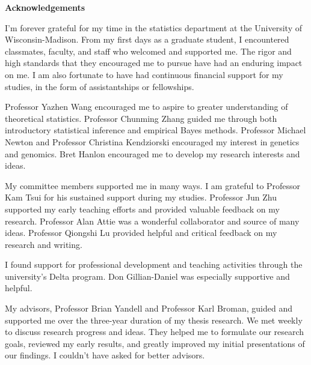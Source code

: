 \newenvironment{acknowledgements}%
    {\cleardoublepage\null\vfill\begin{center}%
    \bfseries Acknowledgements\end{center}}%
    {\vfill\null}
        \begin{acknowledgements}
I'm forever grateful for my time in the statistics department at the University of Wisconsin-Madison. From my first days as a graduate student, I encountered classmates, faculty, and staff who welcomed and supported me. The rigor and high standards that they encouraged me to pursue have had an enduring impact on me. I am also fortunate to have had continuous financial support for my studies, in the form of assistantships or fellowships. 

Professor Yazhen Wang encouraged me to aspire to greater understanding of theoretical statistics. Professor Chunming Zhang guided me through both introductory statistical inference and empirical Bayes methods. Professor Michael Newton and Professor Christina Kendziorski encouraged my interest in genetics and genomics. Bret Hanlon encouraged me to develop my research interests and ideas. 

My committee members supported me in many ways. I am grateful to Professor Kam Tsui for his sustained support during my studies. Professor Jun Zhu supported my early teaching efforts and provided valuable feedback on my research. Professor Alan Attie was a wonderful collaborator and source of many ideas. Professor Qiongshi Lu provided helpful and critical feedback on my research and writing.

I found support for professional development and teaching activities through the university's Delta program. Don Gillian-Daniel was especially supportive and helpful. 

My advisors, Professor Brian Yandell and Professor Karl Broman, guided and supported me over the three-year duration of my thesis research. We met weekly to discuss research progress and ideas. They helped me to formulate our research goals, reviewed my early results, and greatly improved my initial presentations of our findings. I couldn't have asked for better advisors.



\end{acknowledgements}